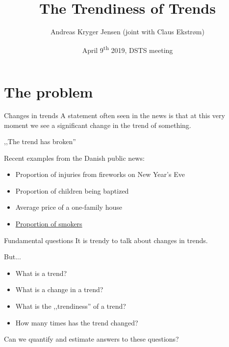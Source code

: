 \documentclass[ignorenonframetext,xcolor=pdflatex,table,dvipsnames,serif]{beamer}
\title{The Trendiness of Trends}
\date{April 9\textsuperscript{th} 2019, DSTS meeting}
\author{Andreas Kryger Jensen \scriptsize (joint with Claus Ekstrøm)}
\institute{Biostatistics, Institute of Public Health\\ University of Copenhagen}
\begin{document}
\frame[plain]{\titlepage}
 
 

\section{The problem}

\begin{frame}{Changes in trends}
A statement often seen in the news is that at \alert{this very moment} we see a significant change in the trend of something.

\vspace{0.5cm}

\begin{center}
,,The trend has broken''
\end{center}

\vspace{0.5cm}

Recent examples from the Danish public news:
\begin{itemize}
  \item{Proportion of injuries from fireworks on New Year's Eve}
  \item{Proportion of children being baptized}
  \item{Average price of a one-family house}
  \item{\underline{Proportion of smokers}}
\end{itemize}
\end{frame}

\begin{frame}{Fundamental questions}
It is \alert{trendy} to talk about changes in \alert{trends}.

But...
\begin{itemize}
  \item{What is a \alert{trend}?}
  \item{What is a change in a \alert{trend}?}
  \item{What is the ,,\alert{trendiness}'' of a \alert{trend}?}
  \item{How many times has the \alert{trend} changed?}
\end{itemize}
Can we quantify and estimate answers to these questions?
\end{frame}
\end{document}
